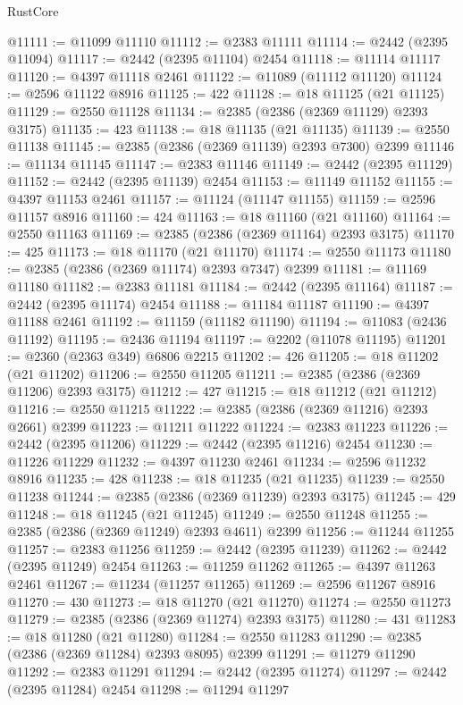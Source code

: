 \begin{lexlean}{RustCore}
\begin{coremodule}
@11111 := @11099 @11110
@11112 := @2383 @11111
@11114 := @2442 (@2395 @11094)
@11117 := @2442 (@2395 @11104) @2454
@11118 := @11114 @11117
@11120 := @4397 @11118 @2461
@11122 := @11089 (@11112 @11120)
@11124 := @2596 @11122 @8916
@11125 := 422
@11128 := @18 @11125 (@21 @11125)
@11129 := @2550 @11128
@11134 := @2385 (@2386 (@2369 @11129) @2393 @3175)
@11135 := 423
@11138 := @18 @11135 (@21 @11135)
@11139 := @2550 @11138
@11145 := @2385 (@2386 (@2369 @11139) @2393 @7300) @2399
@11146 := @11134 @11145
@11147 := @2383 @11146
@11149 := @2442 (@2395 @11129)
@11152 := @2442 (@2395 @11139) @2454
@11153 := @11149 @11152
@11155 := @4397 @11153 @2461
@11157 := @11124 (@11147 @11155)
@11159 := @2596 @11157 @8916
@11160 := 424
@11163 := @18 @11160 (@21 @11160)
@11164 := @2550 @11163
@11169 := @2385 (@2386 (@2369 @11164) @2393 @3175)
@11170 := 425
@11173 := @18 @11170 (@21 @11170)
@11174 := @2550 @11173
@11180 := @2385 (@2386 (@2369 @11174) @2393 @7347) @2399
@11181 := @11169 @11180
@11182 := @2383 @11181
@11184 := @2442 (@2395 @11164)
@11187 := @2442 (@2395 @11174) @2454
@11188 := @11184 @11187
@11190 := @4397 @11188 @2461
@11192 := @11159 (@11182 @11190)
@11194 := @11083 (@2436 @11192)
@11195 := @2436 @11194
@11197 := @2202 (@11078 @11195)
@11201 := @2360 (@2363 @349) @6806 @2215
@11202 := 426
@11205 := @18 @11202 (@21 @11202)
@11206 := @2550 @11205
@11211 := @2385 (@2386 (@2369 @11206) @2393 @3175)
@11212 := 427
@11215 := @18 @11212 (@21 @11212)
@11216 := @2550 @11215
@11222 := @2385 (@2386 (@2369 @11216) @2393 @2661) @2399
@11223 := @11211 @11222
@11224 := @2383 @11223
@11226 := @2442 (@2395 @11206)
@11229 := @2442 (@2395 @11216) @2454
@11230 := @11226 @11229
@11232 := @4397 @11230 @2461
@11234 := @2596 @11232 @8916
@11235 := 428
@11238 := @18 @11235 (@21 @11235)
@11239 := @2550 @11238
@11244 := @2385 (@2386 (@2369 @11239) @2393 @3175)
@11245 := 429
@11248 := @18 @11245 (@21 @11245)
@11249 := @2550 @11248
@11255 := @2385 (@2386 (@2369 @11249) @2393 @4611) @2399
@11256 := @11244 @11255
@11257 := @2383 @11256
@11259 := @2442 (@2395 @11239)
@11262 := @2442 (@2395 @11249) @2454
@11263 := @11259 @11262
@11265 := @4397 @11263 @2461
@11267 := @11234 (@11257 @11265)
@11269 := @2596 @11267 @8916
@11270 := 430
@11273 := @18 @11270 (@21 @11270)
@11274 := @2550 @11273
@11279 := @2385 (@2386 (@2369 @11274) @2393 @3175)
@11280 := 431
@11283 := @18 @11280 (@21 @11280)
@11284 := @2550 @11283
@11290 := @2385 (@2386 (@2369 @11284) @2393 @8095) @2399
@11291 := @11279 @11290
@11292 := @2383 @11291
@11294 := @2442 (@2395 @11274)
@11297 := @2442 (@2395 @11284) @2454
@11298 := @11294 @11297

\end{coremodule}
\end{lexlean}
